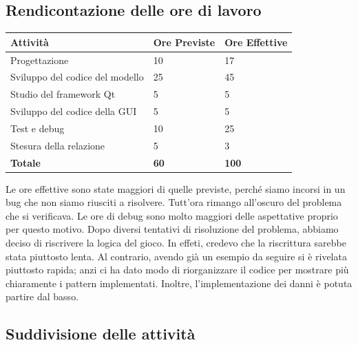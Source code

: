 \documentclass[11pt]{article}
\begin{document}
\subsection{Rendicontazione delle ore di lavoro}

\begin{table}[ht]
	\centering
	\begin{tabular}{|l|l|l|}
		\hline
		\textbf{Attività} & \textbf{Ore Previste} & \textbf{Ore Effettive} \\
		\hline
		Progettazione & 10 & 17 \\
		\hline
		Sviluppo del codice del modello & 25 & 45 \\
		\hline
		Studio del framework Qt & 5 & 5 \\
		\hline
		Sviluppo del codice della GUI & 5 & 5 \\
		\hline
		Test e debug & 10 & 25 \\
		\hline
		Stesura della relazione & 5 & 3 \\
		\hline
		\textbf{Totale} & \textbf{60} & \textbf{100} \\
		\hline
	\end{tabular}
\end{table}

Le ore effettive sono state maggiori di quelle previste, perché siamo incorsi in
un bug che non siamo riusciti a risolvere. Tutt'ora rimango all'oscuro del
problema che si verificava. Le ore di debug sono molto maggiori delle 
aspettative proprio per questo motivo. Dopo diversi tentativi di risoluzione 
del problema,
abbiamo deciso di riscrivere la logica del gioco. In effeti, credevo che la
riscrittura sarebbe stata piuttosto lenta. Al contrario, avendo già un esempio
da seguire si è rivelata piuttosto rapida; anzi ci ha dato modo di riorganizzare
il codice per mostrare più chiaramente i pattern implementati. Inoltre,
l'implementazione dei danni è potuta partire dal basso.

\subsection{Suddivisione delle attività}
\end{document}
